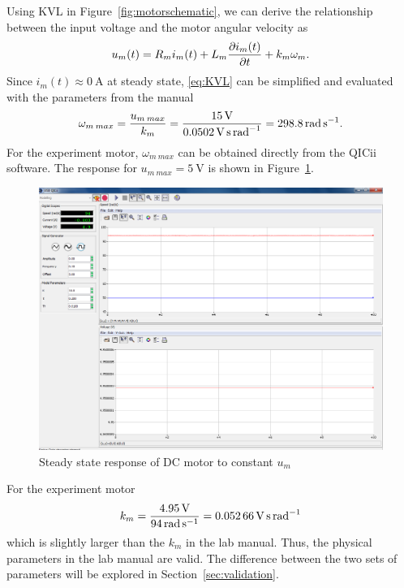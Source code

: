 Using KVL in Figure~\ref{fig:motorschematic}, we can derive the relationship between the input voltage and the motor angular velocity as
\begin{equation}\label{eq:KVL}
  u_m(t) = R_m i_m(t) + L_m \pdv{i_m(t)}{t} + k_m \omega_m.
\end{equation}
Since $i_m(t) \approx \SI{0}{\ampere}$ at steady state, \eqref{eq:KVL} can be simplified and evaluated with the parameters from the manual
\begin{equation*}
  \omega_{m\>max} = {u_{m\>max} \over k_m} = {\SI{15}{\volt} \over \SI{0.0502}{\volt\second\per\radian}} = \SI{298.8}{\radian\per\second}.
\end{equation*}
For the experiment motor, $\omega_{m\>max}$ can be obtained directly from the QICii software.
The response for $u_{m\>max} = \SI{5}{\volt}$ is shown in Figure~\ref{fig:wmax}.
\begin{figure}[t!]
  \centering
  \includegraphics[width=0.95\linewidth]{graphics/part2}
  \caption{Steady state response of DC motor to constant $u_m$}
  \label{fig:wmax}
\end{figure}

\pagebreak
For the experiment motor
\begin{equation*}
  k_m = {\SI{4.95}{\volt} \over \SI{94}{\radian\per\second}} = \SI{0.05266}{\volt\second\per\radian}
\end{equation*}
which is slightly larger than the $k_m$ in the lab manual.
Thus, the physical parameters in the lab manual are valid.
The difference between the two sets of parameters will be explored in Section~\ref{sec:validation}.

